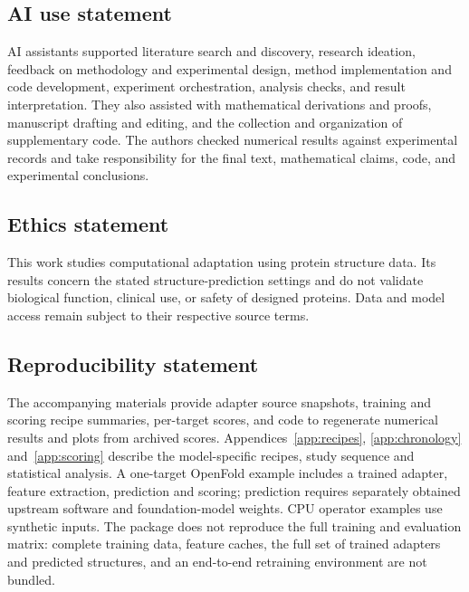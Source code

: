 \subsection*{AI use statement}
AI assistants supported literature search and discovery, research ideation,
feedback on methodology and experimental design, method implementation and
code development, experiment orchestration, analysis checks, and result
interpretation. They also assisted with mathematical derivations and proofs,
manuscript drafting and editing, and the collection and organization of
supplementary code. The authors checked numerical results against
experimental records and take responsibility for the final text,
mathematical claims, code, and experimental conclusions.

\subsection*{Ethics statement}
This work studies computational adaptation using protein structure data. Its
results concern the stated structure-prediction settings and do not validate
biological function, clinical use, or safety of designed proteins. Data and model
access remain subject to their respective source terms.

\subsection*{Reproducibility statement}
The accompanying materials provide adapter source snapshots, training and
scoring recipe summaries, per-target scores, and code to regenerate numerical
results and plots from archived scores. Appendices~\ref{app:recipes},
\ref{app:chronology} and~\ref{app:scoring} describe the model-specific recipes,
study sequence and statistical analysis. A one-target OpenFold example
includes a trained adapter, feature extraction, prediction and scoring;
prediction requires separately obtained upstream software and foundation-model
weights. CPU operator examples use synthetic inputs. The package does not
reproduce the full training and evaluation matrix: complete training data,
feature caches, the full set of trained adapters and predicted structures,
and an end-to-end retraining environment are not bundled.
